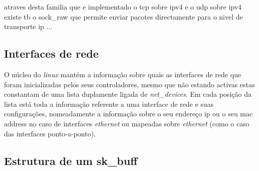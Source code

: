 atraves desta familia que e implementado o tcp sobre ipv4 e o udp sobre ipv4 existe tb o sock\_raw que permite enviar pacotes directamente para o nivel de transporte ip ... 

% 
%						
%
% 

\subsection{Interfaces de rede}

O núcleo do \textit{linux} mantém a informação sobre quais as interfaces de rede que foram inicializadas pelos seus controladores, mesmo que não estando activas estas constantam de uma lista duplamente ligada de \textit{net\_devices}. 
 Em cada posição da lista está toda a informação referente a uma interface de rede e suas configurações, nomeadamente a informação sobre o seu endereço ip ou o seu mac address no caso de interfaces \textit{ethernet} ou mapeadas sobre \textit{ethernet} (como o caso das interfaces ponto-a-ponto).
 
\subsection{Estrutura de um sk\_buff}

